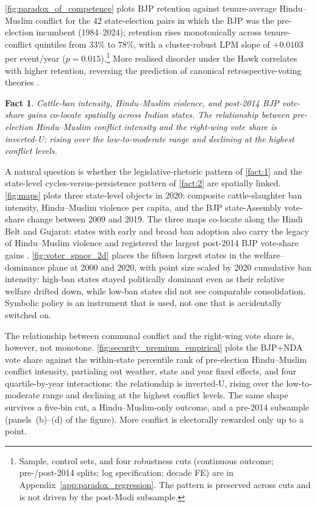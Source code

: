 \documentclass[11pt,twoside]{extarticle}
\newtheorem{fact}{Fact}
\begin{document}
\autoref{fig:paradox_of_competence} plots BJP retention against tenure-average Hindu--Muslim conflict for the $42$ state-election pairs in which the BJP was the pre-election incumbent (1984--2024); retention rises monotonically across tenure-conflict quintiles from $33\%$ to $78\%$, with a cluster-robust LPM slope of $+0.0103$ per event/year ($p=0.015$).\footnote{Sample, control sets, and four robustness cuts (continuous outcome; pre-/post-2014 splits; log specification; decade FE) are in Appendix~\ref{app:paradox_regression}. The pattern is preserved across cuts and is not driven by the post-Modi subsample.} More realised disorder under the Hawk correlates with higher retention, reversing the prediction of canonical retrospective-voting theories \citep*{wilkinsonVotesViolenceElectoral2006}.

\begin{fact}\label{fact:3}
Cattle-ban intensity, Hindu--Muslim violence, and post-2014 BJP vote-share gains co-locate spatially across Indian states. The relationship between pre-election Hindu--Muslim conflict intensity and the right-wing vote share is inverted-U: rising over the low-to-moderate range and declining at the highest conflict levels.
\end{fact}

A natural question is whether the legislative-rhetoric pattern of \autoref{fact:1} and the state-level cycles-versus-persistence pattern of \autoref{fact:2} are spatially linked. \autoref{fig:maps} plots three state-level objects in 2020: composite cattle-slaughter ban intensity, Hindu--Muslim violence per capita, and the BJP state-Assembly vote-share change between 2009 and 2019. The three maps co-locate along the Hindi Belt and Gujarat: states with early and broad ban adoption also carry the legacy of Hindu--Muslim violence and registered the largest post-2014 BJP vote-share gains \citep*{jhaTradeInstitutionsEthnic2013}. \autoref{fig:voter_space_2d} places the fifteen largest states in the welfare--dominance plane at 2000 and 2020, with point size scaled by 2020 cumulative ban intensity: high-ban states stayed politically dominant even as their relative welfare drifted down, while low-ban states did not see comparable consolidation. Symbolic policy is an instrument that is used, not one that is accidentally switched on.

The relationship between communal conflict and the right-wing vote share is, however, not monotone. \autoref{fig:security_premium_empirical} plots the BJP+NDA vote share against the within-state percentile rank of pre-election Hindu--Muslim conflict intensity, partialing out weather, state and year fixed effects, and four quartile-by-year interactions: the relationship is inverted-U, rising over the low-to-moderate range and declining at the highest conflict levels. The same shape survives a five-bin cut, a Hindu--Muslim-only outcome, and a pre-2014 subsample (panels~(b)--(d) of the figure). More conflict is electorally rewarded only up to a point.
\end{document}
